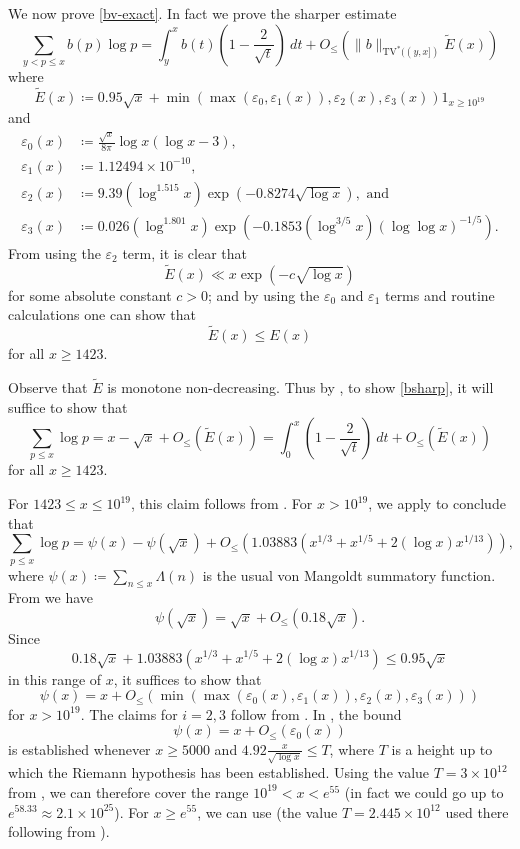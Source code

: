 \documentclass[10pt,a4paper,reqno]{amsart}
\numberwithin{equation}{section}
\theoremstyle{plain}
\theoremstyle{definition}
\newcommand\eps{\varepsilon}
\begin{document}
We now prove \eqref{bv-exact}. In fact we prove the sharper estimate
\begin{equation}\label{bsharp}
  \sum_{y < p \leq x} b(p) \log p = \int_y^x b(t) \left(1 - \frac{2}{\sqrt{t}}\right) \ dt
+ O_\leq\left(\|b\|_{\mathrm{TV}^*((y,x])} \tilde E(x) \right)
\end{equation}
where
\begin{equation}\label{etil-def}
\tilde E(x) \coloneqq 0.95 \sqrt{x} + \min( \max(\eps_0,\eps_1(x)), \eps_2(x), \eps_3(x)) 1_{x \geq 10^{19}}
\end{equation}
and
\begin{align*}
  \eps_0(x) &\coloneqq \frac{\sqrt{x}}{8\pi} \log x(\log x - 3),\\
  \eps_1(x) &\coloneqq 1.12494 \times 10^{-10},\\
  \eps_2(x) &\coloneqq 9.39 (\log^{1.515} x) \exp(-0.8274\sqrt{\log x}),\text{ and}\\
  \eps_3(x) &\coloneqq 0.026 (\log^{1.801} x) \exp(-0.1853 (\log^{3/5} x) (\log\log x)^{-1/5}).
\end{align*}
From using the $\eps_2$ term, it is clear that
$$ \tilde E(x) \ll x \exp(-c \sqrt{\log x})$$
for some absolute constant $c>0$; and by using the $\eps_0$ and $\eps_1$ terms and routine calculations one can show that
$$ \tilde E(x) \leq E(x)$$
for all $x \geq 1423$.

Observe that $\tilde E$ is monotone non-decreasing. Thus by , to show \eqref{bsharp}, it will suffice to show that
$$ \sum_{p \leq x} \log p = x - \sqrt{x} + O_{\leq}(\tilde E(x))
  = \int_0^x \left(1-\frac{2}{\sqrt{t}}\right)\ dt + O_{\leq}(\tilde E(x))$$
for all $x \geq 1423$.

For $1423 \leq x \leq 10^{19}$, this claim follows from \cite[Theorem 2]{buthe-2}.  For $x > 10^{19}$, we apply \cite[(6.10), (6.11)]{buthe} to conclude that
$$
\sum_{p \leq x} \log p = \psi(x) - \psi(\sqrt{x}) + O_{\leq}(1.03883 (x^{1/3} + x^{1/5} + 2 (\log x) x^{1/13})),$$
where $\psi(x) \coloneqq \sum_{n \leq x}
\Lambda(n)$ is the usual von Mangoldt summatory function.
From \cite[Theorems 10,12]{rs} we have
$$ \psi(\sqrt{x}) = \sqrt{x} + O_{\leq}(0.18 \sqrt{x}).$$
Since
$$ 0.18 \sqrt{x} + 1.03883 (x^{1/3} + x^{1/5} + 2 (\log x) x^{1/13}) \leq 0.95 \sqrt{x}$$
in this range of $x$, it suffices to show that
$$ \psi(x) = x + O_{\leq}(\min( \max(\eps_0(x),\eps_1(x)), \eps_2(x), \eps_3(x)) )$$
for $x > 10^{19}$.  The claims for $i=2,3$ follow from \cite[Theorems 1.1, 1.4]{johnston-yang}.  In \cite[Theorem 2, (7.3)]{buthe}, the bound
$$ \psi(x) = x + O_{\leq}(\eps_0(x))$$
is established whenever $x \geq 5000$ and $4.92 \frac{x}{\sqrt{\log x}} \leq T$, where $T$ is a height up to which the Riemann hypothesis has been established.  Using the value $T = 3 \times 10^{12}$ from \cite{platt-rh}, we can therefore cover the range $10^{19} < x < e^{55}$ (in fact we could go up to $e^{58.33} \approx 2.1 \times 10^{25}$).  For $x \geq e^{55}$, we can use \cite[Table 2]{buthe} (the value $T = 2.445 \times 10^{12}$ used there following from \cite{platt-rh}).
\end{document}
